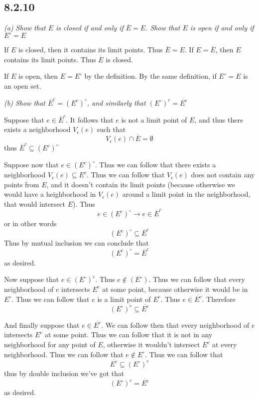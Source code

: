 \documentclass[11pt,oneside,titlepage]{book}
\begin{document}
\subsection*{8.2.10}
\textit{(a) Show that $E$ is closed if and only if $\overline E = E$. Show that $E$ is open if
  and only if $E^\circ = E$}

If $E$ is closed, then it contains its limit points. Thus $\overline E = E$.
If $E = \overline E$, then $E$ contains its limit points. Thus $\overline E$ is closed.

If $E$ is open, then $E = E^\circ$ by the definition. By the same definition, if $E^\circ = E$
is an open set.

\textit{(b) Show that $\overline{E}^c = (E^c)^\circ$, and similarly that
  $(E^\circ)^c = \overline{E^c}$}

Suppose that $e \in \overline{E}^c$. It follows that $e$ is not a limit point of $E$, and
thus there exists a neighborhood $V_\epsilon(e)$ such that
$$V_\epsilon(e) \cap \overline E = \emptyset$$
thus $\overline{E}^c \subseteq (E^c)^\circ$

Suppose now that $e \in (E^c)^\circ$. Thus we can follow that there exists a neighborhood
$V_\epsilon(e) \subseteq E^c$. Thus we can follow that $V_\epsilon(e)$ does not contain any
points from $E$, and it doesn't contain its limit points (because otherwise we would
have a heighborhood in $V_\epsilon(e)$ around a limit point in the neighborhood, that
would intersect $E$). Thus
$$e \in (E^c)^\circ \to e \in \overline{E}^c$$
or in other words
$$(E^c)^\circ \subseteq \overline{E}^c$$
Thus by mutual inclusion we can conclude that
$$(E^c)^\circ = \overline{E}^c$$
as desired.

Now suppose that $e \in (E^\circ)^c$. Thus $e \notin (E^\circ)$. Thus we can follow that
every neighborhood of $e$ intersects $E^c$ at some point, because otherwise it would be
in $E^\circ$. Thus we can follow that $e$ is a limit point of $E^c$. Thus $e \in \overline{E^c}$.
Therefore
$$(E^\circ)^c \subseteq \overline{E^c}$$

And finally suppose that $e \in \overline{E^c}$. We can follow then that every
neighborhood of $e$ intersects $E^c$ at some point. Thus we can follow that it is not
in any neighborhood for any point of $E$, otherwise it wouldn't intersect $E^c$ at every
neighborhood. Thus we can follow that $e \notin E^\circ$. Thus we can follow that
$$\overline{E^c} \subseteq (E^\circ)^c $$
thus by double inclusion we've got that
$$(E^\circ)^c = \overline{E^c}$$
as desired.
\end{document}
